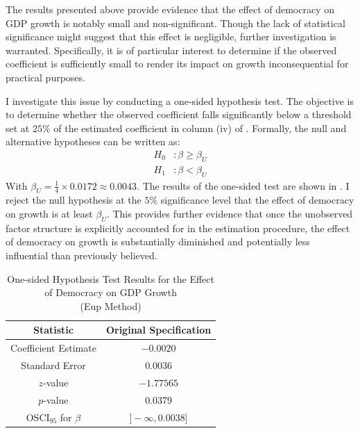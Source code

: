 The results presented above provide evidence that the effect of democracy on \ac{GDP} growth is notably small and  non-significant. Though the lack of statistical significance might suggest that this effect is negligible, further investigation is warranted. Specifically, it is of particular interest to determine if the observed coefficient is sufficiently small to render its impact on growth inconsequential for practical purposes.

I investigate this issue by conducting a one-sided hypothesis test. The objective is to determine whether the observed coefficient falls significantly below a threshold set at $25 \%$ of the estimated coefficient in column (iv) of . Formally, the null and alternative hypotheses can be written as:
\begin{align*}
H_0 &: \beta \geq \beta_U \\
H_1 &: \beta < \beta_U
\end{align*}
With $\beta_U = \frac{1}{4} \times 0.0172 \approx 0.0043$. The results of the one-sided test are shown in . I reject the null hypothesis at the $5\%$ significance level that the effect of democracy on growth is at least $\beta_U$. This provides further evidence that once the unobserved factor structure is explicitly accounted for in the estimation procedure, the effect of democracy on growth is substantially diminished and potentially less influential than previously believed.

\begin{table}[htb]
    \caption{One-sided Hypothesis Test Results for the Effect of Democracy on GDP Growth \\
    (\ac{Eup} Method)}\label{tab:test}
    \centering
    \begin{tabular}{cc}
        \hline
        Statistic & Original Specification  \\
        \hline
        Coefficient Estimate & $-0.0020$\\
        Standard Error & 0.0036 \\
        $z$-value & $-1.77565$ \\
        $p$-value & 0.0379 \\
        $\text{OSCI}_{95}$  for $\beta$ & $]-\infty, 0.0038]$ \\
        \hline
    \end{tabular}

    \label{tab:results}
\end{table}



